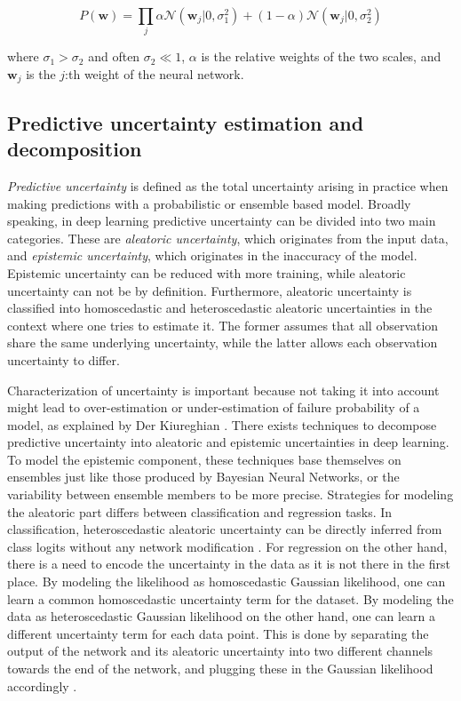 	\begin{equation}
	\label{eq:gsm}
		P(\pmb{w}) = 
		\prod_{j}\alpha \mathcal{N}(\pmb{w}_j|0,\sigma_1^2) + (1-\alpha)\mathcal{N}(\pmb{w}_j|0,\sigma_2^2)
	\end{equation}  
	
	where $\sigma_1 > \sigma_2$ and often $\sigma_2 \ll 1$, $\alpha$ is the relative weights of the two scales, and $\pmb{w}_j$ is the $j$:th weight of the neural network. 
	
\subsection{Predictive uncertainty estimation and decomposition}

\textit{Predictive uncertainty} is defined as the total uncertainty arising in practice when making predictions with a probabilistic or ensemble based model.
Broadly speaking, in deep learning predictive uncertainty can be divided into two main categories. These are  \textit{aleatoric uncertainty}, which originates from the input data, and \textit{epistemic uncertainty}, which originates in the inaccuracy of the model. Epistemic uncertainty can be reduced with more training, while aleatoric uncertainty can not be by definition. Furthermore, aleatoric uncertainty is classified into homoscedastic and heteroscedastic aleatoric uncertainties in the context where one tries to estimate it. The former assumes that all observation share the same underlying uncertainty, while the latter allows each observation uncertainty to differ. \cite{shridhar_comprehensive_2019}

Characterization of uncertainty is important because not taking it into account might lead to over-estimation or under-estimation of failure probability of a model, as explained by Der Kiureghian \cite{kiureghian_aleatory_2009}. 
There exists techniques to decompose predictive uncertainty into aleatoric and epistemic uncertainties in deep learning. To model the epistemic component, these techniques base themselves on ensembles just like those produced by Bayesian Neural Networks, or the variability between ensemble members to be more precise. Strategies for modeling the aleatoric part differs between classification and regression tasks. In classification, heteroscedastic aleatoric uncertainty can be directly inferred from class logits without any network modification \cite{shridhar_comprehensive_2019, kwon_uncertainty_2020}. For regression on the other hand, there is a need to encode the uncertainty in the data as it is not there in the first place. By modeling the likelihood as homoscedastic Gaussian likelihood, one can learn a common homoscedastic uncertainty term for the dataset. By modeling the data as heteroscedastic Gaussian likelihood on the other hand, one can learn a different uncertainty term for each data point. This is done by separating the output of the network and its aleatoric uncertainty into two different channels towards the end of the network, and plugging these in the Gaussian likelihood accordingly \cite{kendall_what_2017}.

